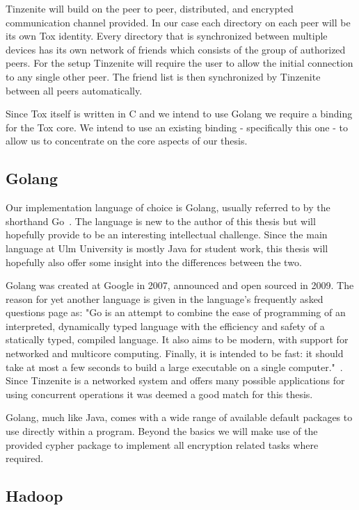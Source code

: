 Tinzenite will build on the peer to peer, distributed, and encrypted communication channel provided.
In our case each directory on each peer will be its own Tox identity.
Every directory that is synchronized between multiple devices has its own network of friends which consists of the group of authorized peers.
For the setup Tinzenite will require the user to allow the initial connection to any single other peer.
The friend list is then synchronized by Tinzenite between all peers automatically.

Since Tox itself is written in C and we intend to use Golang we require a binding for the Tox core.
We intend to use an existing binding - specifically this one \cite{web:site:tox:golang} - to allow us to concentrate on the core aspects of our thesis.

\subsection{Golang}

Our implementation language of choice is Golang, usually referred to by the shorthand Go~\cite{web:site:golang}.
The language is new to the author of this thesis but will hopefully provide to be an interesting intellectual challenge.
Since the main language at Ulm University is mostly Java for student work, this thesis will hopefully also offer some insight into the differences between the two.

Golang was created at Google in 2007, announced and open sourced in 2009.
The reason for yet another language is given in the language's frequently asked questions page as: "Go is an attempt to combine the ease of programming of an interpreted, dynamically typed language with the efficiency and safety of a statically typed, compiled language. It also aims to be modern, with support for networked and multicore computing. Finally, it is intended to be fast: it should take at most a few seconds to build a large executable on a single computer."~\cite{web:site:golang:faq}.
Since Tinzenite is a networked system and offers many possible applications for using concurrent operations it was deemed a good match for this thesis.

Golang, much like Java, comes with a wide range of available default packages to use directly within a program.
Beyond the basics we will make use of the provided cypher package to implement all encryption related tasks where required.

\subsection{Hadoop}

